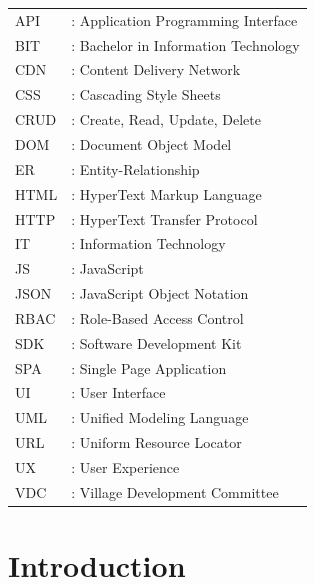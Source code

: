 \documentclass[12pt,a4paper]{report}
\begin{document}
\noindent
\begin{tabular}{@{}ll}
API   & : Application Programming Interface         \\[2pt]
BIT   & : Bachelor in Information Technology        \\[2pt]
CDN   & : Content Delivery Network                  \\[2pt]
CSS   & : Cascading Style Sheets                    \\[2pt]
CRUD  & : Create, Read, Update, Delete              \\[2pt]
DOM   & : Document Object Model                     \\[2pt]
ER    & : Entity-Relationship                       \\[2pt]
HTML  & : HyperText Markup Language                 \\[2pt]
HTTP  & : HyperText Transfer Protocol               \\[2pt]
IT    & : Information Technology                    \\[2pt]
JS    & : JavaScript                                \\[2pt]
JSON  & : JavaScript Object Notation                \\[2pt]
RBAC  & : Role-Based Access Control                 \\[2pt]
SDK   & : Software Development Kit                  \\[2pt]
SPA   & : Single Page Application                   \\[2pt]
UI    & : User Interface                            \\[2pt]
UML   & : Unified Modeling Language                 \\[2pt]
URL   & : Uniform Resource Locator                  \\[2pt]
UX   & : User Experience                            \\[2pt]
VDC   & : Village Development Committee             \\[2pt]
\end{tabular}

\clearpage
{}
\setcounter{page}{1}

\chapter{Introduction}
\end{document}
